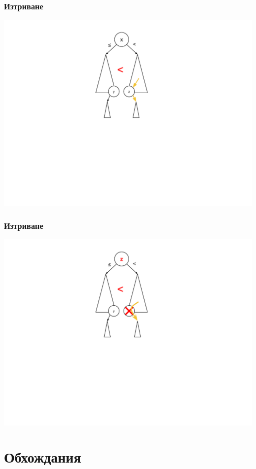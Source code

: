 \documentclass{beamer}
\begin{document}
\begin{frame}[fragile]
\frametitle{Изтриване}

\includegraphics[width=14cm]{images/tree_delete_2}

\end{frame}


\begin{frame}[fragile]
\frametitle{Изтриване}

\includegraphics[width=14cm]{images/tree_delete_3}

\end{frame}

\section{Обхождания} 
\end{document}
